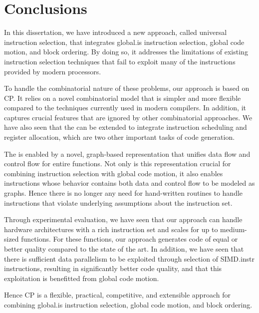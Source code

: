%

\chapter{Conclusions}

In this dissertation, we have introduced a new approach, called \gls{universal
  instruction selection}, that integrates \gls{global.is} \gls{instruction
  selection}, \gls{global code motion}, and \gls{block ordering}.
%
By doing so, it addresses the limitations of existing \gls{instruction
  selection} techniques that fail to exploit many of the \glspl{instruction}
provided by modern processors.

To handle the combinatorial nature of these problems, our approach is based on
\glsdesc{CP}.
%
It relies on a novel combinatorial model that is simpler and more flexible
compared to the techniques currently used in modern \glspl{compiler}.
%
In addition, it captures crucial features that are ignored by other
combinatorial approaches.
%
We have also seen that the  can be extended to
integrate \gls{instruction scheduling} and \gls{register allocation}, which are
two other important tasks of \gls{code generation}.

The  is enabled by a novel, \gls{graph}-based
representation that unifies data flow and control flow for entire
\glspl{function}.
%
Not only is this representation crucial for combining \gls{instruction
  selection} with \gls{global code motion}, it also enables \glspl{instruction}
whose behavior contains both data and control flow to be modeled as
\glspl{graph}.
%
Hence there is no longer any need for hand-written routines to handle
\glspl{instruction} that violate underlying assumptions about the
\gls{instruction set}.

Through experimental evaluation, we have seen that our approach can handle
hardware architectures with a rich \gls{instruction set} and scales for up to
medium-sized \glspl{function}.
%
For these \glspl{function}, our approach generates code of equal or better
quality compared to the state of the art.
%
In addition, we have seen that there is sufficient data parallelism to be
exploited through selection of \gls{SIMD.instr} \glspl{instruction}, resulting
in significantly better code quality, and that this exploitation is benefitted
from \gls{global code motion}.

Hence \glsdesc{CP} is a flexible, practical, competitive, and extensible
approach for combining \gls{global.is} \gls{instruction selection}, \gls{global
  code motion}, and \gls{block ordering}.
